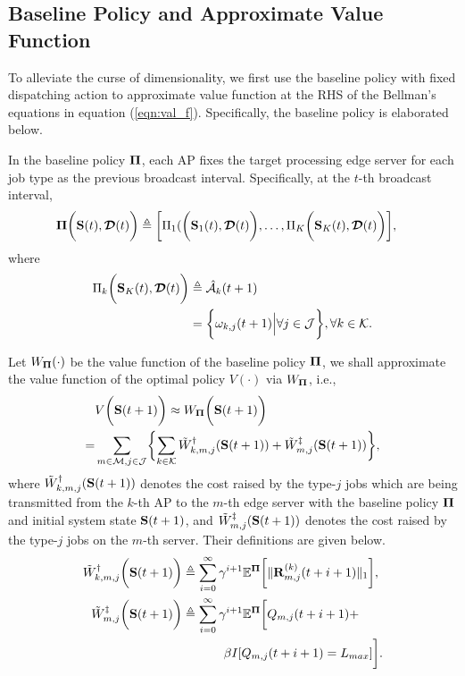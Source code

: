 \subsection{Baseline Policy and Approximate Value Function}
\label{subsec:baseline}
To alleviate the curse of dimensionality, we first use the baseline policy with fixed dispatching action to approximate value function at the RHS of the Bellman's equations in equation (\ref{eqn:val_f}).
Specifically, the baseline policy is elaborated below.

\begin{policy}
    In the baseline policy $\boldsymbol{\Pi}$, each AP fixes the target processing edge server for each job type as the previous broadcast interval. Specifically, at the $t$-th broadcast interval,
    {\small
    \begin{align}
        \boldsymbol{\Pi}\bigg(\mathbf{S}(t),\boldsymbol{\mathcal{D}}(t)\bigg) &\triangleq \bigg[ \Pi_{1}(\bigg(\mathbf{S}_{1}(t),\boldsymbol{\mathcal{D}}(t)\bigg), \dots, \Pi_{K}\bigg(\mathbf{S}_{K}(t),\boldsymbol{\mathcal{D}}(t)\bigg) \bigg],
    \end{align}
    }
    where 
    \begin{align}
        \Pi_{k}\bigg(\mathbf{S}_{K}(t),\boldsymbol{\mathcal{D}}(t)\bigg) &\triangleq
        \hat{\mathcal{A}}_{k}(t+1)
        \nonumber\\
        &= \bigg\{
            \omega_{k,j}(t+1) \Big| \forall j\in\mathcal{J}
        \bigg\}, \forall k\in\mathcal{K}.
    \end{align}
\end{policy}

Let $W_{\boldsymbol{\Pi}}(\cdot)$ be the value function of the baseline policy $\boldsymbol{\Pi}$, we shall approximate the value function of the optimal policy $V(\cdot)$ via $W_{\boldsymbol{\Pi}}$, i.e.,
{\small
\begin{align}
    &V\Paren{\Stat(t+1)} \approx W_{\Baseline}\Paren{\Stat(t+1)}
    \nonumber\\
    =& \sum_{m\in\esSet,j\in\jSpace}\Brace{
        \sum_{k\in\apSet} \tilde{W}^{\AP}_{k,m,j}(\Stat(t+1))
        +\tilde{W}^{\ES}_{m,j}(\Stat(t+1))
    },
    \label{eqn:baseline}
\end{align}
}
where $\tilde{W}^{\dagger}_{k,m,j}(\mathbf{S}(t+1))$ denotes the cost raised by the type-$j$ jobs which are being transmitted from the $k$-th AP to the $m$-th edge server with the baseline policy $\boldsymbol{\Pi}$ and initial system state $\mathbf{S}(t+1)$, and $\tilde{W}^{\ddagger}_{m,j}(\mathbf{S}(t+1))$ denotes the cost raised by the type-$j$ jobs on the $m$-th server.
Their definitions are given below.
{\small
\begin{align}
    \tilde{W}^{\dagger}_{k,m,j} \bigg(\mathbf{S}(t+1)\bigg) &\triangleq
        \sum_{i=0}^{\infty} \gamma^{i+1} \mathbb{E}^{\boldsymbol{\Pi}}\bigg[
            \lVert\mathbf{R}^{(k)}_{m,j}(t+i+1)\|_1
        \bigg],
    \\    
    \tilde{W}^{\ddagger}_{m,j} \bigg(\mathbf{S}(t+1)\bigg) &\triangleq
        \sum_{i=0}^{\infty} \gamma^{i+1} \mathbb{E}^{\boldsymbol{\Pi}}\bigg[
            Q_{m,j}(t+i+1) +
            \nonumber\\
            &~~~~~~~~~~\beta I[Q_{m,j}(t+i+1) = L_{max}]
        \bigg].
\end{align}
}

